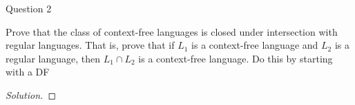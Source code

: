 \begin{solution}{Question 2}\label{ques:2}
    \begin{question}
    Prove that the class of context-free languages is closed under intersection with regular languages. That is, prove that if $L_1$ is a context-free language and $L_2$ is a regular language, then $L_1 \cap L_2$ is a context-free language. Do this by starting with a DF
    \end{question}
    \tcblower{}
    \begin{proof}[Solution]
    \end{proof}
\end{solution}
